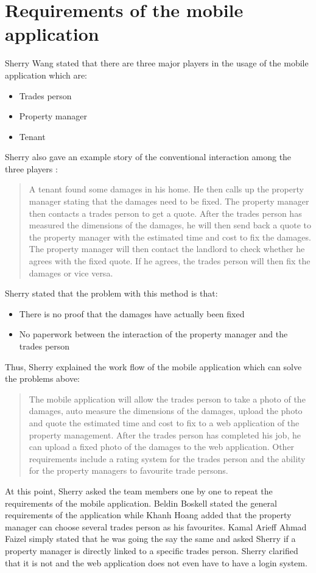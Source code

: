 \documentclass[12pt]{article}
\begin{document}
\section*{Requirements of the mobile application}
Sherry Wang stated that there are three major players in the usage of the mobile application which are:
\begin{itemize}
\item Trades person
\item Property manager
\item Tenant
\end{itemize}
Sherry also gave an example story of the conventional interaction among the three players :
\begin{quote}
A tenant found some damages in his home. He then calls up the property manager stating that the damages need to be fixed. The property manager then contacts a trades person to get a quote. After the trades person has measured the dimensions of the damages, he will then send back a quote to the property manager with the estimated time and cost to fix the damages. The property manager will then contact the landlord to check whether he agrees with the fixed quote. If he agrees, the trades person will then fix the damages or vice versa.
\end{quote}
Sherry stated that the problem with this method is that:
\begin{itemize}
\item There is no proof that the damages have actually been fixed
\item No paperwork between the interaction of the property manager and the trades person
\end{itemize}
Thus, Sherry explained the work flow of the mobile application which can solve the problems above:
\begin{quote}
The mobile application will allow the trades person to take a photo of the damages, auto measure the dimensions of the damages, upload the photo and quote the estimated time and cost to fix to a web application of the property management. After the trades person has completed his job, he can upload a fixed photo of the damages to the web application. Other requirements include a rating system for the trades person and the ability for the property managers to favourite trade persons. 
\end{quote}
At this point, Sherry asked the team members one by one to repeat the requirements of the mobile application. Beldin Boskell stated the general requirements of the application while Khanh Hoang added that the property manager can choose several trades person as his favourites. Kamal Arieff Ahmad Faizel simply stated that he was going the say the same and asked Sherry if a property manager is directly linked to a specific trades person. Sherry clarified that it is not and the web application does not even have to have a login system.
\end{document}
